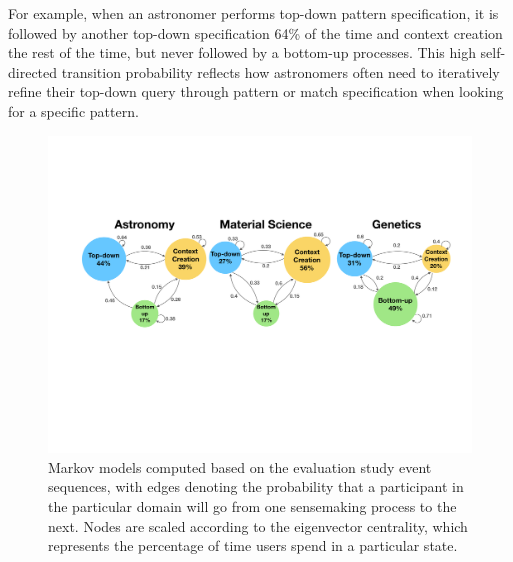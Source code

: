 For example, when an astronomer performs top-down pattern specification, 
it is followed by another top-down specification 
64\% of the time and context creation the rest of the time, 
but never followed by a bottom-up processes. 
This high self-directed transition probability 
reflects how astronomers often need to iteratively 
refine their top-down query through pattern 
or match specification when looking for a specific pattern. %
\begin{figure}[h!]
  \includegraphics[width=\linewidth]{figures/markov_transition.pdf}
  \caption{Markov models computed based on the evaluation study event sequences, with edges denoting the probability that a participant in the particular domain will go from one sensemaking process to the next. Nodes are scaled according to the eigenvector centrality, which represents the percentage of time users  spend in a particular state.}\label{fig:transition}
\end{figure}
